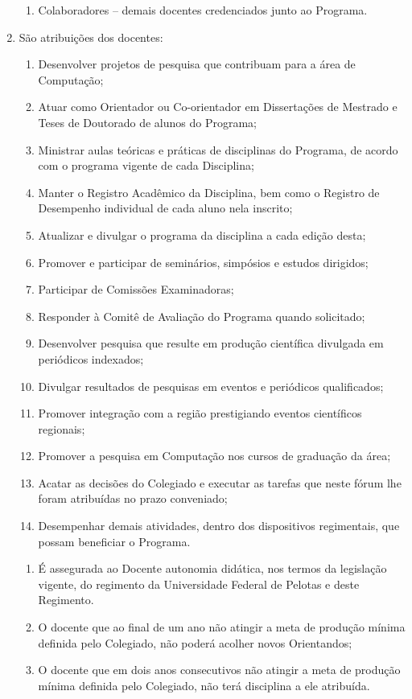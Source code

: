 \documentclass{article}
\begin{document}
\begin{enumerate}
\begin{enumerate}[label=\Roman*]
		\item Colaboradores – demais docentes credenciados junto ao Programa.

	\end{enumerate}

	\item São atribuições dos docentes:
	\begin{enumerate}[label=\Roman*]
		\item 	Desenvolver projetos de pesquisa que contribuam para a área de Computação;
		\item	Atuar como Orientador ou Co-orientador em Dissertações de Mestrado e Teses de Doutorado de alunos do Programa;
		\item	Ministrar aulas teóricas e práticas de disciplinas do Programa, de acordo com o programa vigente de cada Disciplina;
		\item	Manter o Registro Acadêmico da Disciplina, bem como o Registro de Desempenho individual de cada aluno nela inscrito;
		\item	Atualizar e divulgar o programa da disciplina a cada edição desta;
		\item	Promover e participar de seminários, simpósios e estudos dirigidos;
		\item	Participar de Comissões Examinadoras;
		\item	Responder à Comitê de Avaliação do Programa quando solicitado;
		\item	Desenvolver pesquisa que resulte em produção científica divulgada em periódicos indexados;
		\item	Divulgar resultados de pesquisas em eventos e periódicos qualificados;
		\item	Promover integração com a região prestigiando eventos científicos regionais;
		\item	Promover a pesquisa em Computação nos cursos de graduação da área;
		\item	Acatar as decisões do Colegiado e executar as tarefas que neste fórum lhe foram atribuídas no prazo conveniado;
		\item	Desempenhar demais atividades, dentro dos dispositivos regimentais, que possam beneficiar o Programa.
	\end{enumerate}

	\begin{enumerate}
		\item É assegurada ao Docente autonomia didática, nos termos da legislação vigente, do regimento da Universidade Federal de Pelotas e deste Regimento.

		\item O docente que ao final de um ano não atingir a meta de produção mínima definida pelo Colegiado, não poderá acolher novos Orientandos;

		\item O docente que em dois anos consecutivos não atingir a meta de produção mínima definida pelo Colegiado, não terá disciplina a ele atribuída.

	\end{enumerate}
\end{enumerate}
\end{document}

